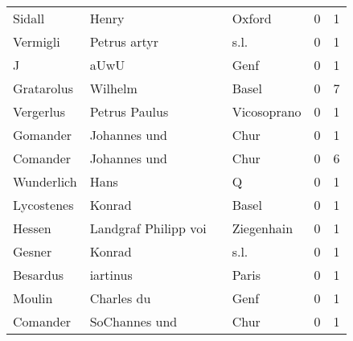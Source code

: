 \begin{tabular}{llllrr}
                   Sidall &                              Henry &             &                                      Oxford &          0 &         1 \\
                 Vermigli &                       Petrus artyr &             &                                        s.l. &          0 &         1 \\
                        J &                               aUwU &             &                                        Genf &          0 &         1 \\
               Gratarolus &                            Wilhelm &             &                                       Basel &          0 &         7 \\
                Vergerlus &                      Petrus Paulus &             &                                 Vicosoprano &          0 &         1 \\
                 Gomander &                       Johannes und &             &                                        Chur &          0 &         1 \\
                 Comander &                       Johannes und &             &                                        Chur &          0 &         6 \\
               Wunderlich &                               Hans &             &                                           Q &          0 &         1 \\
               Lycostenes &                             Konrad &             &                                       Basel &          0 &         1 \\
                   Hessen &               Landgraf Philipp voi &             &                                  Ziegenhain &          0 &         1 \\
                   Gesner &                             Konrad &             &                                        s.l. &          0 &         1 \\
                 Besardus &                           iartinus &             &                                       Paris &          0 &         1 \\
                   Moulin &                         Charles du &             &                                        Genf &          0 &         1 \\
                 Comander &                      SoChannes und &             &                                        Chur &          0 &         1 \\

\end{tabular}
